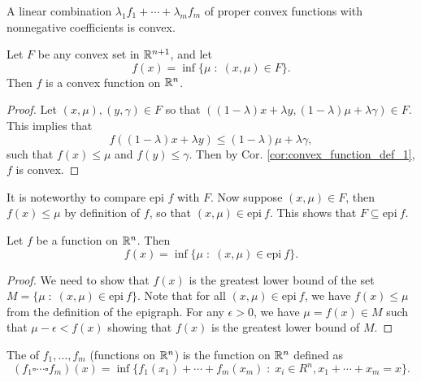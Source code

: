 \documentclass[11pt,a4paper]{article}
\begin{document}
\begin{corollary}
    A linear combination $\lambda_1 f_1+\cdots + \lambda_m f_m$ of proper convex functions with nonnegative coefficients is convex.
\end{corollary}

\begin{theorem}\label{thm:convex_set_inf_convex_function}
    Let $F$ be any convex set in $\mathbb{R}^{n+1}$, and let 
    \begin{equation*}
        f(x) = \inf\{\mu\;:\;(x,\mu)\in F\}.
    \end{equation*}
    Then $f$ is a convex function on $\mathbb{R}^n$.
\end{theorem}

\begin{proof}
    Let $(x,\mu),(y,\gamma)\in F$ so that $((1-\lambda)x+\lambda y, (1-\lambda)\mu+\lambda \gamma)\in F$. This implies that
    \begin{equation}\label{eqn:}
        f((1-\lambda)x+\lambda y) \le (1-\lambda)\mu+\lambda \gamma,
    \end{equation} 
    such that $f(x)\le \mu$ and $f(y)\le \gamma$. Then by Cor. \ref{cor:convex_function_def_1}, $f$ is convex.
\end{proof}

\begin{remark}
    It is noteworthy to compare epi $f$ with $F$. Now suppose $(x,\mu)\in F$, then $f(x)\le \mu$ by definition of $f$, so that $(x,\mu)\in \mathrm{epi}\ f$. This shows that $F\subseteq \mathrm{epi}\ f$. 
\end{remark}

\begin{proposition}\label{prop:f_inf_epi_f}
    Let $f$ be a function on $\mathbb{R}^n$. Then
    \begin{equation*}
        f(x) = \inf \{\mu\;:\;(x,\mu)\in \mathrm{epi}\ f\}.
    \end{equation*}
\end{proposition}

\begin{proof}
    We need to show that $f(x)$ is the greatest lower bound of the set $M = \{\mu\;:\;(x,\mu)\in \mathrm{epi}\ f\}$. Note that for all $(x,\mu)\in \mathrm{epi}\ f$, we have $f(x)\le \mu$ from the definition of the epigraph. For any $\epsilon>0$, we have $\mu = f(x)\in M$ such that $\mu-\epsilon<f(x)$ showing that $f(x)$ is the greatest lower bound of $M$.
\end{proof}

\begin{definition}
    The  of $f_1,\ldots,f_m$ (functions on $\mathbb{R}^n$) is the function on $\mathbb{R}^n$ defined as 
    \begin{equation*}
        (f_1\square \cdots \square f_m)(x) = \inf\{f_1(x_1)+\cdots + f_m(x_m)\;:\;x_i\in R^n,x_1+\cdots+x_m = x\}.
    \end{equation*} 
\end{definition}
\end{document}
